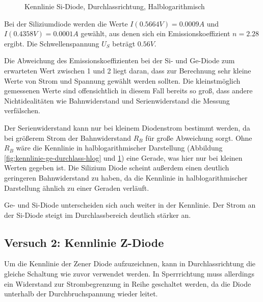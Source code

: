 \documentclass[a4paper]{article}
\begin{document}
\begin{figure}[H]
    \centering
    \caption{Kennlinie Si-Diode, Durchlassrichtung, Halblogarithmisch}
    \label{fig:kennlinie-si-durchlass-hlog}
\end{figure}

Bei der Siliziumdiode werden die Werte $I(0.5664\si{V})=0.0009\si{A}$ und $I(0.4358\si{V})=0.0001\si{A}$ gewählt, aus denen sich ein Emissionskoeffizient $n=2.28$ ergibt.
Die Schwellenspannung $U_S$ beträgt $0.56\si{V}$.

Die Abweichung des Emissionskoeffizienten bei der Si- und Ge-Diode zum erwarteten Wert zwischen 1 und 2 liegt daran, dass zur Berechnung sehr kleine Werte von Strom und Spannung gewählt werden sollten. Die kleinstmöglich gemessenen Werte sind offensichtlich in diesem Fall bereits so groß, dass andere Nichtidealitäten wie Bahnwiderstand und Serienwiderstand die Messung verfälschen.

Der Serienwiderstand kann nur bei kleinem Diodenstrom bestimmt werden, da bei größerem Strom der Bahnwiderstand $R_B$ für große Abweichung sorgt. Ohne $R_B$ wäre die Kennlinie in halblogarithmischer Darstellung (Abbildung \ref{fig:kennlinie-ge-durchlass-hlog} und \ref{fig:kennlinie-si-durchlass-hlog}) eine Gerade, was hier nur bei kleinen Werten gegeben ist. Die Silizium Diode scheint außerdem einen deutlich geringeren Bahnwiderstand zu haben, da die Kennlinie in halblogarithmischer Darstellung ähnlich zu einer Geraden verläuft.

Ge- und Si-Diode unterscheiden sich auch weiter in der Kennlinie. Der Strom an der Si-Diode steigt im Durchlassbereich deutlich stärker an.

\subsection{Versuch 2: Kennlinie Z-Diode}

Um die Kennlinie der Zener Diode aufzuzeichnen, kann in Durchlassrichtung die gleiche Schaltung wie zuvor verwendet werden. In Sperrrichtung muss allerdings ein Widerstand zur Strombegrenzung in Reihe geschaltet werden, da die Diode unterhalb der Durchbruchspannung wieder leitet.
\end{document}
